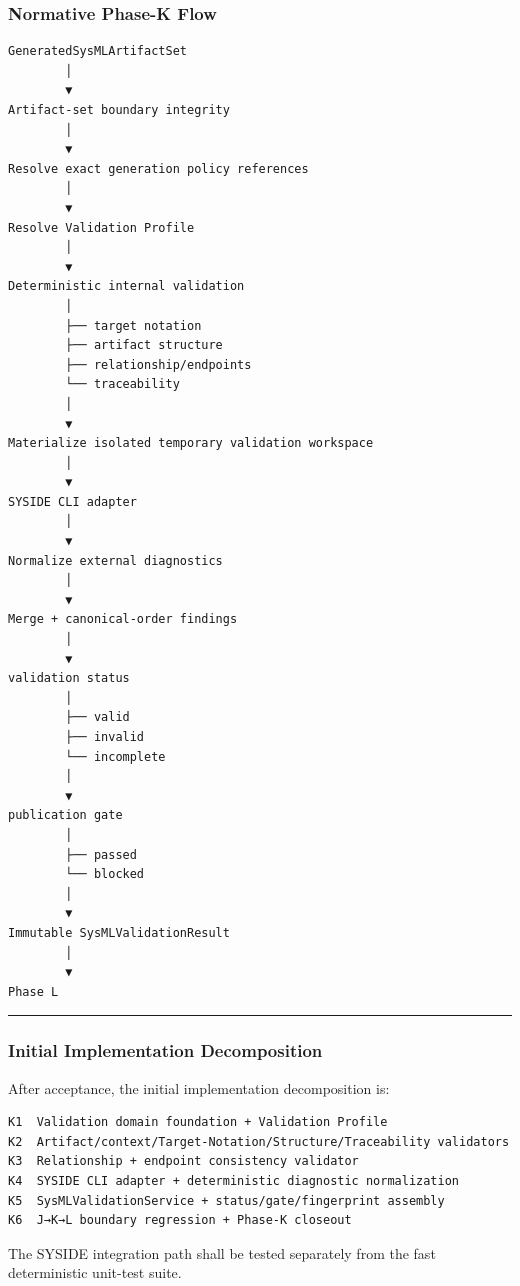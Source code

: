 \hypertarget{normative-phase-k-flow}{%
\subsubsection{Normative Phase-K Flow}\label{normative-phase-k-flow}}

\begin{verbatim}
GeneratedSysMLArtifactSet
        │
        ▼
Artifact-set boundary integrity
        │
        ▼
Resolve exact generation policy references
        │
        ▼
Resolve Validation Profile
        │
        ▼
Deterministic internal validation
        │
        ├── target notation
        ├── artifact structure
        ├── relationship/endpoints
        └── traceability
        │
        ▼
Materialize isolated temporary validation workspace
        │
        ▼
SYSIDE CLI adapter
        │
        ▼
Normalize external diagnostics
        │
        ▼
Merge + canonical-order findings
        │
        ▼
validation status
        │
        ├── valid
        ├── invalid
        └── incomplete
        │
        ▼
publication gate
        │
        ├── passed
        └── blocked
        │
        ▼
Immutable SysMLValidationResult
        │
        ▼
Phase L
\end{verbatim}

\begin{center}\rule{0.5\linewidth}{0.5pt}\end{center}

\hypertarget{initial-implementation-decomposition-2}{%
\subsubsection{Initial Implementation Decomposition}\label{initial-implementation-decomposition-2}}

After acceptance, the initial implementation decomposition is:

\begin{verbatim}
K1  Validation domain foundation + Validation Profile
K2  Artifact/context/Target-Notation/Structure/Traceability validators
K3  Relationship + endpoint consistency validator
K4  SYSIDE CLI adapter + deterministic diagnostic normalization
K5  SysMLValidationService + status/gate/fingerprint assembly
K6  J→K→L boundary regression + Phase-K closeout
\end{verbatim}

The SYSIDE integration path shall be tested separately from the fast deterministic unit-test suite.

